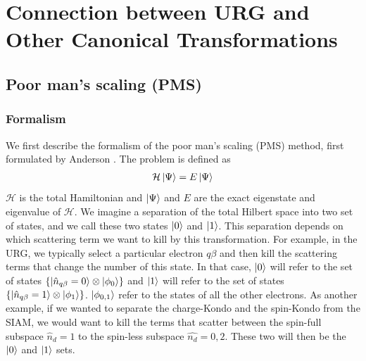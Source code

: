 \chapter{Connection between URG and Other Canonical Transformations}
\label{urg_canonical}
\section{Poor man's scaling (PMS)}
\subsection{Formalism}
We first describe the formalism of the poor man's scaling (PMS) method, first formulated by Anderson \cite{anderson1970}. The problem is defined as
\begin{equation}\begin{aligned}
	\label{problem}
\mathcal{H}\ket{\Psi} = E\ket{\Psi}
\end{aligned}\end{equation}
\(\mathcal{H}\) is the total Hamiltonian and \(\ket{\Psi}\) and \(E\) are the exact eigenstate and eigenvalue of \(\mathcal{H}\). We imagine a separation of the total Hilbert space into two set of states, and we call these two states \(\ket{0}\) and \(\ket{1}\). This separation depends on which scattering term we want to kill by this transformation. For example, in the URG, we typically select a particular electron \(q\beta\) and then kill the  scattering terms that change the number of this state. In that case, \(\ket{0}\) will refer to the set of states \(\left\{\ket{\hat n_{q\beta}=0}\otimes\ket{\phi_0}\right\}\) and \(\ket{1}\) will refer to the set of states \(\left\{\ket{\hat n_{q\beta}=1}\otimes\ket{\phi_1}\right\}\). \(\ket{\phi_{0,1}}\) refer to the states of all the other electrons. As another example, if we wanted to separate the charge-Kondo and the spin-Kondo from the SIAM, we would want to kill the terms that scatter between the spin-full subspace \(\hat n_d=1\) to the spin-less subspace \(\hat{n_d}=0,2\). These two will then be the \(\ket{0}\) and \(\ket{1}\) sets. 

